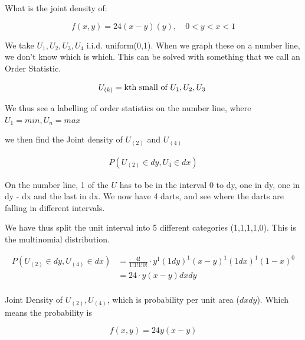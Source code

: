 \documentclass{report}
\begin{document}
What is the joint density of: 

\[
f(x,y) = 24(x-y)(y), \quad 0<y<x<1
\]

We take $ U_1, U_2, U_3, U_4 $ i.i.d. uniform(0,1). When we graph these on a number line, we don't know which is which. This can be solved with something that we call an Order Statistic. 

\[
	U_{(k)} = \text{kth small of $ U_1,U_2,U_3 $ }
\]

We thus see a labelling of order statistics on the number line, where $ U_1 = min, U_{n} = max $ 

we then find the Joint density of $ U_{(2)} $ and $ U_{(4)} $ 


\begin{align*}
	P(U_{(2)} \in dy, U_{4} \in  dx)
\end{align*}


On the number line, 1 of the $ U $ has to be in the interval 0 to dy, one in dy, one in dy - dx and the last in dx. We now have 4 darts, and see where the darts are falling in different intervals. 


We have thus split the unit interval into 5 different categories (1,1,1,1,0). This is the multinomial distribution. 


\begin{align*}
	P(U_{(2)} \in dy, U_{(4)} \in dx) &= \frac{4!}{1!1!1!0!} \cdot y^{1}(1 dy)^{1}(x-y)^{1}(1dx)^{1}(1-x)^{0} \\
	&= 24 \cdot y (x-y) dxdy \\
\end{align*}

Joint Density of $ U_{(2)}, U_{(4)} $, which is probability per unit area ($ dxdy $). Which means the probability is 

\[
f(x,y) = 24y(x-y)
\]


\end{document}
